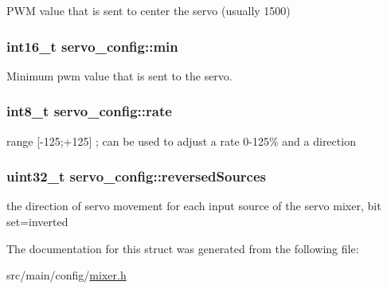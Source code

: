 P\+W\+M value that is sent to center the servo (usually 1500) 

\hypertarget{structservo__config_a8b1c26f5402d045623107565facdc34b}{
\subsubsection[{min}]{\setlength{\rightskip}{0pt plus 5cm}int16\+\_\+t servo\+\_\+config\+::min}}\label{structservo__config_a8b1c26f5402d045623107565facdc34b}


Minimum pwm value that is sent to the servo. 

\hypertarget{structservo__config_a418cf99c621aae96fbb8cde4ad27e596}{
\subsubsection[{rate}]{\setlength{\rightskip}{0pt plus 5cm}int8\+\_\+t servo\+\_\+config\+::rate}}\label{structservo__config_a418cf99c621aae96fbb8cde4ad27e596}


range \mbox{[}-\/125;+125\mbox{]} ; can be used to adjust a rate 0-\/125\% and a direction 

\hypertarget{structservo__config_ae8aa38f21749724eaf11abad725454a8}{
\subsubsection[{reversed\+Sources}]{\setlength{\rightskip}{0pt plus 5cm}uint32\+\_\+t servo\+\_\+config\+::reversed\+Sources}}\label{structservo__config_ae8aa38f21749724eaf11abad725454a8}


the direction of servo movement for each input source of the servo mixer, bit set=inverted 



The documentation for this struct was generated from the following file\+:\begin{DoxyCompactItemize}
\item 
src/main/config/\hyperlink{config_2mixer_8h}{mixer.\+h}\end{DoxyCompactItemize}
